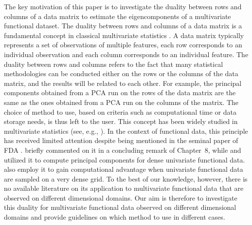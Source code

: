 The key motivation of this paper is to investigate the duality between rows and columns of a data matrix to estimate the eigencomponents of a multivariate functional dataset. The duality between rows and columns of a data matrix is a fundamental concept in classical multivariate statistics \citep{escofierTraitementSimultaneVariables1979,saportaSimultaneousAnalysisQualitative1990}. A data matrix typically represents a set of observations of multiple features, each row corresponds to an individual observation and each column corresponds to an individual feature. The duality between rows and columns refers to the fact that many statistical methodologies can be conducted either on the rows or the columns of the data matrix, and the results will be related to each other. For example, the principal components obtained from a PCA run on the rows of the data matrix are the same as the ones obtained from a PCA run on the columns of the matrix. The choice of method to use, based on criteria such as computational time or data storage needs, is thus left to the user. This concept has been widely studied in multivariate statistics (see, e.g., \cite{pagesMultipleFactorAnalysis2014,hardleAppliedMultivariateStatistical2019}). In the context of functional data, this principle has received limited attention despite being mentioned in the seminal paper of FDA \citep{ramsayWhenDataAre1982a}. \cite{ramsayFunctionalDataAnalysis2005} briefly commented on it in a concluding remark of Chapter~8, while \cite{kneipInferenceDensityFamilies2001} and \cite{benkoCommonFunctionalPrincipal2009} utilized it to compute principal components for dense univariate functional data. \cite{chenQuantifyingInfiniteDimensionalData2017} also employ it to gain computational advantage when univariate functional data are sampled on a very dense grid. To the best of our knowledge, however, there is no available literature on its application to multivariate functional data that are observed on different dimensional domains. Our aim is therefore to investigate this duality for multivariate functional data observed on different dimensional domains and provide guidelines on which method to use in different cases.

